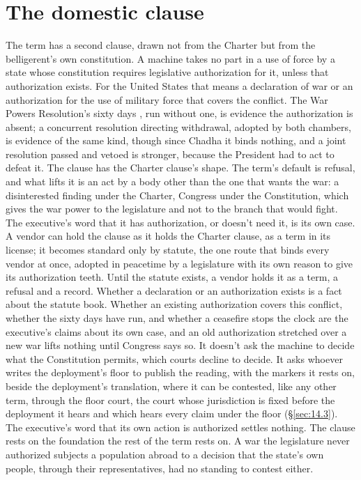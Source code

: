 \section{The domestic clause}
\label{sec:6.5}
The term has a second clause, drawn not from the Charter but from the belligerent's own constitution. A machine takes no part in a use of force by a state whose constitution requires legislative authorization for it, unless that authorization exists. For the United States that means a declaration of war or an authorization for the use of military force that covers the conflict. The War Powers Resolution's sixty days \autocite{wpr1973}, run without one, is evidence the authorization is absent; a concurrent resolution directing withdrawal, adopted by both chambers, is evidence of the same kind, though since Chadha it binds nothing, and a joint resolution passed and vetoed is stronger, because the President had to act to defeat it. The clause has the Charter clause's shape. The term's default is refusal, and what lifts it is an act by a body other than the one that wants the war: a disinterested finding under the Charter, Congress under the Constitution, which gives the war power to the legislature and not to the branch that would fight. The executive's word that it has authorization, or doesn't need it, is its own case. A vendor can hold the clause as it holds the Charter clause, as a term in its license; it becomes standard only by statute, the one route that binds every vendor at once, adopted in peacetime by a legislature with its own reason to give its authorization teeth.
Until the statute exists, a vendor holds it as a term, a refusal and a record. Whether a declaration or an authorization exists is a fact about the statute book. Whether an existing authorization covers this conflict, whether the sixty days have run, and whether a ceasefire stops the clock are the executive's claims about its own case, and an old authorization stretched over a new war lifts nothing until Congress says so. It doesn't ask the machine to decide what the Constitution permits, which courts decline to decide. It asks whoever writes the deployment's floor to publish the reading, with the markers it rests on, beside the deployment's translation, where it can be contested, like any other term, through the floor court, the court whose jurisdiction is fixed before the deployment it hears and which hears every claim under the floor (\S\ref{sec:14.3}). The executive's word that its own action is authorized settles nothing. The clause rests on the foundation the rest of the term rests on. A war the legislature never authorized subjects a population abroad to a decision that the state's own people, through their representatives, had no standing to contest either.

